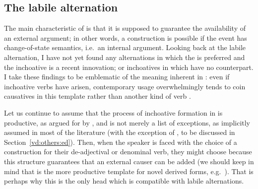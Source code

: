 \begin{exe}
\begin{xlist}
\begin{xlist}
\begin{exe}
\begin{exe}
\begin{xlist}
\begin{exe}
\begin{xlist}
\begin{exe}
\begin{xlist}
\begin{xlist}
\begin{exe}
\begin{xlist}
\begin{exe}
\begin{xlist}
\begin{exe}
\begin{exe}
\begin{exe}
\begin{xlist}
\begin{exe}
\begin{exe}
\begin{xlist}
\begin{xlist}
\begin{exe}
\begin{xlist}
\begin{exe}
\begin{exe}
\begin{exe}
\begin{xlist}
\begin{exe}
\begin{exe}
\begin{xlist}
\begin{exe}
\begin{xlist}
\begin{exe}
\begin{xlist}
\begin{exe}
\begin{xlist}
\begin{exe}
\begin{exe}
\begin{xlist}
\begin{exe}
\begin{exe}
\begin{xlist}
\begin{xlist}
\begin{exe}
\begin{xlist}
\begin{xlist}
\begin{exe}
\begin{xlist}
\begin{exe}
\begin{xlist}
\begin{exe}
\begin{xlist}
\begin{exe}
\begin{xlist}
\begin{exe}
\begin{exe}
\begin{exe}
\begin{exe}
\begin{xlist}
\begin{exe}
\begin{exe}
\begin{xlist}
\begin{xlist}
	\subsection{The labile alternation} \label{vd:caus:labile}
The main characteristic of {\vd} is that it is supposed to guarantee the availability of an external argument; in other words, a  construction is possible if the event has change-of-state semantics, i.e.~an internal argument. Looking back at the labile alternation, I have not yet found any alternations in which the  is preferred and the inchoative is a recent innovation; or inchoatives in {\thif} which have no  counterpart. I take these findings to be emblematic of the  meaning inherent in {\vd}: even if inchoative verbs have arisen, contemporary usage overwhelmingly tends to coin causatives in this template rather than another kind of verb \citep{laks14}.

Let us continue to assume that the process of inchoative formation in {\thif} is productive, as argued for by \cite{lev16}, and is not merely a list of exceptions, as implicitly assumed in most of the literature (with the exception of \citealt{doron03}, to be discussed in Section~\ref{vd:others:ed}). Then, when the speaker is faced with the choice of a construction for their de-adjectival or denominal verb, they might choose {\vd} because this structure guarantees that an external causer can be added (we should keep in mind that {\thit} is the more productive template for novel derived forms, e.g.~\citealt{laks11}). That is perhaps why this is the only head which is compatible with labile alternations.


\end{xlist}
\end{xlist}
\end{exe}
\end{exe}
\end{xlist}
\end{exe}
\end{exe}
\end{exe}
\end{exe}
\end{xlist}
\end{exe}
\end{xlist}
\end{exe}
\end{xlist}
\end{exe}
\end{xlist}
\end{exe}
\end{xlist}
\end{xlist}
\end{exe}
\end{xlist}
\end{xlist}
\end{exe}
\end{exe}
\end{xlist}
\end{exe}
\end{exe}
\end{xlist}
\end{exe}
\end{xlist}
\end{exe}
\end{xlist}
\end{exe}
\end{xlist}
\end{exe}
\end{exe}
\end{xlist}
\end{exe}
\end{exe}
\end{exe}
\end{xlist}
\end{exe}
\end{xlist}
\end{xlist}
\end{exe}
\end{exe}
\end{xlist}
\end{exe}
\end{exe}
\end{exe}
\end{xlist}
\end{exe}
\end{xlist}
\end{exe}
\end{xlist}
\end{xlist}
\end{exe}
\end{xlist}
\end{exe}
\end{xlist}
\end{exe}
\end{exe}
\end{xlist}
\end{xlist}
\end{exe}

